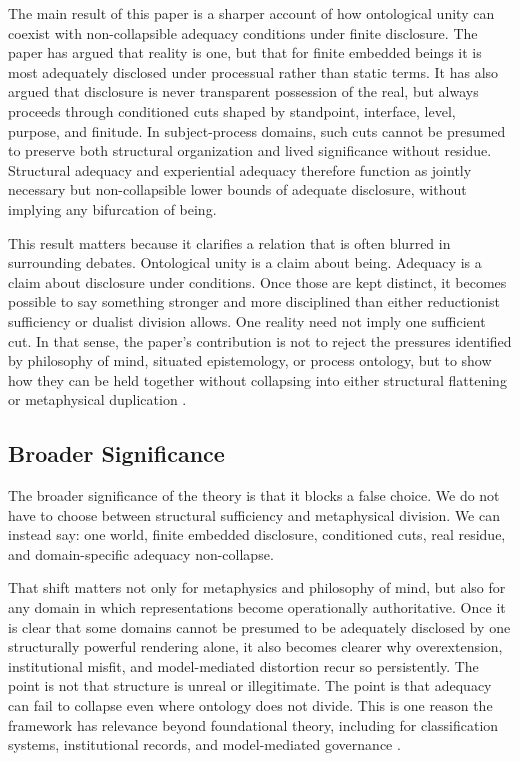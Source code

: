 \documentclass[11pt]{article}
\begin{document}
The main result of this paper is a sharper account of how ontological unity can coexist with non-collapsible adequacy conditions under finite disclosure. The paper has argued that reality is one, but that for finite embedded beings it is most adequately disclosed under processual rather than static terms. It has also argued that disclosure is never transparent possession of the real, but always proceeds through conditioned cuts shaped by standpoint, interface, level, purpose, and finitude. In subject-process domains, such cuts cannot be presumed to preserve both structural organization and lived significance without residue. Structural adequacy and experiential adequacy therefore function as jointly necessary but non-collapsible lower bounds of adequate disclosure, without implying any bifurcation of being.

This result matters because it clarifies a relation that is often blurred in surrounding debates. Ontological unity is a claim about being. Adequacy is a claim about disclosure under conditions. Once those are kept distinct, it becomes possible to say something stronger and more disciplined than either reductionist sufficiency or dualist division allows. One reality need not imply one sufficient cut. In that sense, the paper's contribution is not to reject the pressures identified by philosophy of mind, situated epistemology, or process ontology, but to show how they can be held together without collapsing into either structural flattening or metaphysical duplication \cite{Whitehead1978,Rescher1996,Haraway1988,Nagel1974,Levine1983}.

\subsection{Broader Significance}

The broader significance of the theory is that it blocks a false choice. We do not have to choose between structural sufficiency and metaphysical division. We can instead say: one world, finite embedded disclosure, conditioned cuts, real residue, and domain-specific adequacy non-collapse.

That shift matters not only for metaphysics and philosophy of mind, but also for any domain in which representations become operationally authoritative. Once it is clear that some domains cannot be presumed to be adequately disclosed by one structurally powerful rendering alone, it also becomes clearer why overextension, institutional misfit, and model-mediated distortion recur so persistently. The point is not that structure is unreal or illegitimate. The point is that adequacy can fail to collapse even where ontology does not divide. This is one reason the framework has relevance beyond foundational theory, including for classification systems, institutional records, and model-mediated governance \cite{BowkerStar1999,Fricker2007,ONeil2016,Eubanks2018,ObermeyerEtAl2019}.
\end{document}
